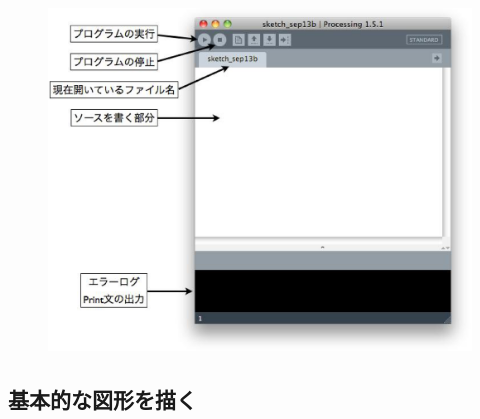 \documentclass[11pt,a4paper]{jarticle}
\begin{document}
\begin{figure}[h!]
 \centering
 \includegraphics[width=0.425\columnwidth]{processing_ide.eps}
\end{figure}

\subsection*{基本的な図形を描く}
\end{document}
